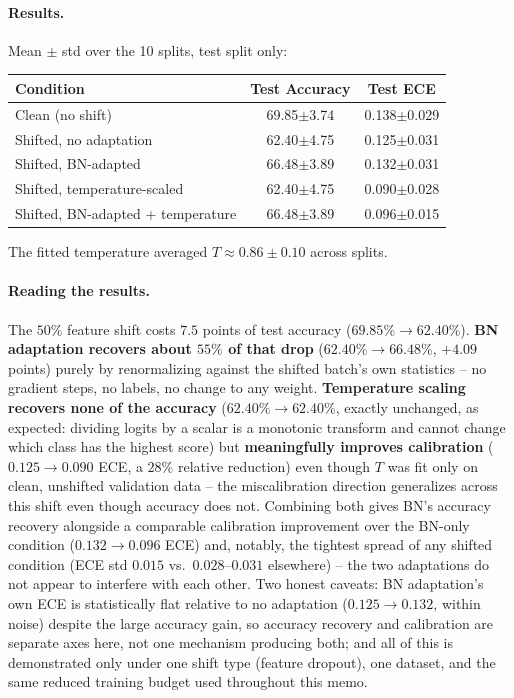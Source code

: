 \documentclass{article}
\newcommand{\score}[2]{#1{\scriptsize$\pm$#2}}
\begin{document}
\paragraph{Results.} Mean $\pm$ std over the 10 splits, test split only:

\begin{center}
\begin{tabular}{lcc}
\toprule
Condition & Test Accuracy & Test ECE \\
\midrule
Clean (no shift)                     & \score{69.85}{3.74} & \score{0.138}{0.029} \\
Shifted, no adaptation               & \score{62.40}{4.75} & \score{0.125}{0.031} \\
Shifted, BN-adapted                  & \score{66.48}{3.89} & \score{0.132}{0.031} \\
Shifted, temperature-scaled          & \score{62.40}{4.75} & \score{0.090}{0.028} \\
Shifted, BN-adapted + temperature    & \score{66.48}{3.89} & \score{0.096}{0.015} \\
\bottomrule
\end{tabular}
\end{center}

The fitted temperature averaged $T \approx 0.86 \pm 0.10$ across splits.

\paragraph{Reading the results.} The $50\%$ feature shift costs $7.5$
points of test accuracy ($69.85\%\to62.40\%$). \textbf{BN adaptation
recovers about $55\%$ of that drop} ($62.40\%\to66.48\%$, $+4.09$ points)
purely by renormalizing against the shifted batch's own statistics --
no gradient steps, no labels, no change to any weight. \textbf{Temperature
scaling recovers none of the accuracy} ($62.40\%\to62.40\%$, exactly
unchanged, as expected: dividing logits by a scalar is a monotonic
transform and cannot change which class has the highest score) but
\textbf{meaningfully improves calibration} ($0.125\to0.090$ ECE, a $28\%$
relative reduction) even though $T$ was fit only on clean, unshifted
validation data -- the miscalibration direction generalizes across this
shift even though accuracy does not. Combining both gives BN's accuracy
recovery alongside a comparable calibration improvement over the
BN-only condition ($0.132\to0.096$ ECE) and, notably, the tightest spread
of any shifted condition (ECE std $0.015$ vs.\ $0.028$--$0.031$
elsewhere) -- the two adaptations do not appear to interfere with each
other. Two honest caveats: BN adaptation's own ECE is statistically flat
relative to no adaptation ($0.125\to0.132$, within noise) despite the
large accuracy gain, so accuracy recovery and calibration are separate
axes here, not one mechanism producing both; and all of this is
demonstrated only under one shift type (feature dropout), one dataset, and
the same reduced training budget used throughout this memo.
\end{document}
